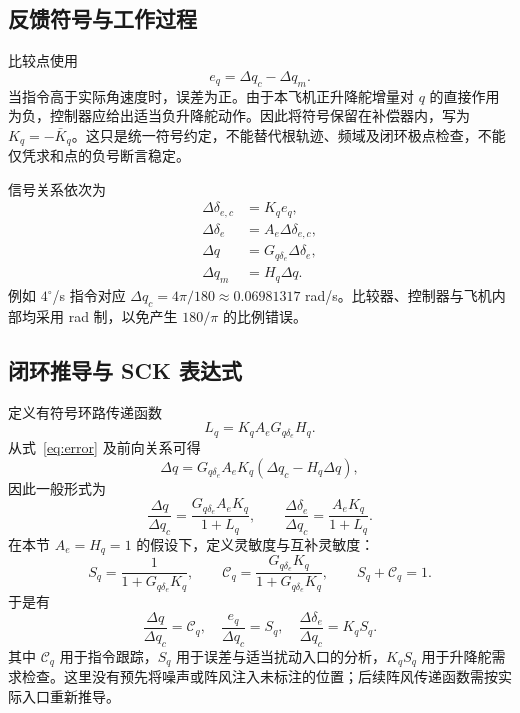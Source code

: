 \documentclass[UTF8,a4paper,11pt,fontset=windows]{ctexart}
\newcommand{\de}{\delta_e}
\newcommand{\Gq}{G_{q\delta_e}}
\begin{document}
\subsection{反馈符号与工作过程}
比较点使用
\begin{equation}\label{eq:error}
e_q=\Delta q_c-\Delta q_m.
\end{equation}
当指令高于实际角速度时，误差为正。由于本飞机正升降舵增量对 $q$ 的直接作用为负，控制器应给出适当负升降舵动作。因此将符号保留在补偿器内，写为 $K_q=-\bar K_q$。这只是统一符号约定，不能替代根轨迹、频域及闭环极点检查，不能仅凭求和点的负号断言稳定。

信号关系依次为
\begin{align}
\Delta\delta_{e,c}&=K_q e_q,\\
\Delta\de&=A_e\Delta\delta_{e,c},\\
\Delta q&=\Gq\Delta\de,\\
\Delta q_m&=H_q\Delta q.
\end{align}
例如 $4^\circ$/s 指令对应 $\Delta q_c=4\pi/180\approx0.06981317$ rad/s。比较器、控制器与飞机内部均采用 rad 制，以免产生 $180/\pi$ 的比例错误。

\subsection{闭环推导与 SCK 表达式}
定义有符号环路传递函数
\begin{equation}
L_q=K_q A_e\Gq H_q.
\end{equation}
从式~\eqref{eq:error} 及前向关系可得
\begin{equation}
\Delta q=\Gq A_eK_q(\Delta q_c-H_q\Delta q),
\end{equation}
因此一般形式为
\begin{equation}
\frac{\Delta q}{\Delta q_c}=\frac{\Gq A_eK_q}{1+L_q},\qquad
\frac{\Delta\de}{\Delta q_c}=\frac{A_eK_q}{1+L_q}.
\end{equation}
在本节 $A_e=H_q=1$ 的假设下，定义灵敏度与互补灵敏度：
\begin{equation}\label{eq:sck}
S_q=\frac{1}{1+\Gq K_q},\qquad
\mathcal C_q=\frac{\Gq K_q}{1+\Gq K_q},\qquad S_q+\mathcal C_q=1.
\end{equation}
于是有
\begin{equation}\label{eq:cl}
\boxed{\frac{\Delta q}{\Delta q_c}=\mathcal C_q,\quad
\frac{e_q}{\Delta q_c}=S_q,\quad
\frac{\Delta\de}{\Delta q_c}=K_qS_q.}
\end{equation}
其中 $\mathcal C_q$ 用于指令跟踪，$S_q$ 用于误差与适当扰动入口的分析，$K_qS_q$ 用于升降舵需求检查。这里没有预先将噪声或阵风注入未标注的位置；后续阵风传递函数需按实际入口重新推导。
\end{document}
